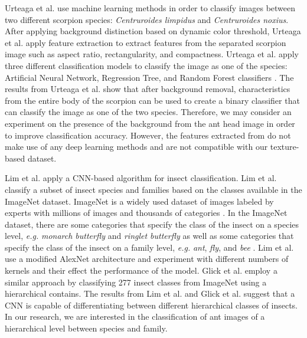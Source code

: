 \documentclass{aci}
\numberwithin{equation}{section}
\begin{document}
Urteaga et al. \cite{urteaga_scorpions_2016} use machine learning methods in
order to classify images between two different scorpion species:
\textit{Centruroides limpidus} and \textit{Centruroides noxius}. After applying
background distinction based on dynamic color threshold, Urteaga et al.
\cite{urteaga_scorpions_2016} apply feature extraction to extract features from
the separated scorpion image such as aspect ratio, rectangularity, and
compactness. Urteaga et al. \cite{urteaga_scorpions_2016} apply three different
classification models to classify the image as one of the species: Artificial
Neural Network, Regression Tree, and Random Forest classifiers
\cite{urteaga_scorpions_2016}. The results from Urteaga et al.
\cite{urteaga_scorpions_2016} show that after background removal,
characteristics from the entire body of the scorpion can be used to create a
binary classifier that can classify the image as one of the two species.
Therefore, we may consider an experiment on the presence of the background from
the ant head image in order to improve classification accuracy. However, the
features extracted from \cite{urteaga_scorpions_2016} do not make use of any
deep learning methods and are not compatible with our texture-based dataset.

Lim et al. \cite{lim_performance_2017} apply a CNN-based algorithm for insect
classification. Lim et al. \cite{lim_performance_2017} classify a subset of
insect species and families based on the classes available in the ImageNet
dataset. ImageNet is a widely used dataset of images labeled by experts with
millions of images and thousands of categories \cite{deng_imagenet_2009}. In the
ImageNet dataset, there are some categories that specify the class of the insect
on a species level, \textit{e.g.} \textit{monarch butterfly} and \textit{ringlet
    butterfly} as well as some categories that specify the class of the insect on a
family level, \textit{e.g.} \textit{ant}, \textit{fly}, and \textit{bee}
\cite{imagenet_labels}. Lim et al. \cite{lim_performance_2017} use a modified
AlexNet architecture and experiment with different numbers of kernels and their
effect the performance of the model. Glick et al. \cite{glick_insect_2016}
employ a similar approach by classifying 277 insect classes from ImageNet using
a hierarchical contains. The results from Lim et al. \cite{lim_performance_2017}
and Glick et al. \cite{glick_insect_2016} suggest that a CNN is capable of
differentiating between different hierarchical classes of insects. In our
research, we are interested in the classification of ant images of a
hierarchical level between species and family.
\end{document}
